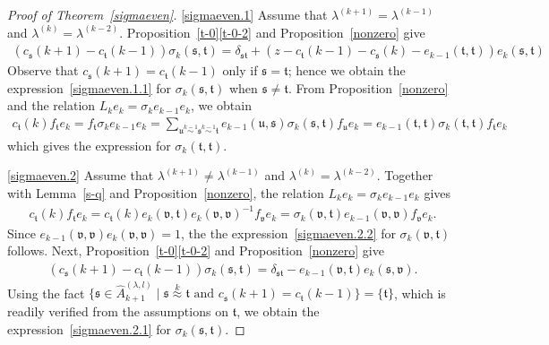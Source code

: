 \documentclass[11pt,a4paper,reqno,svgnames]{amsart}
\theoremstyle{plain}
\theoremstyle{definition}
\numberwithin{equation}{section}
\begin{document}
\begin{proof}[Proof of Theorem~\ref{sigmaeven}] 
\eqref{sigmaeven.1} Assume that  $\lambda^{(k+1)}=\lambda^{(k-1)}$ and $\lambda^{(k)}=\lambda^{(k-2)}$. Proposition~\ref{t-0}\eqref{t-0-2} and Proposition~\ref{nonzero} give
\begin{align*}
(c_\mathfrak{s}(k+1)-c_\mathfrak{t}(k-1))\sigma_{k}(\mathfrak{s,t})=\delta_\mathfrak{st}+(z-c_\mathfrak{t}(k-1)-c_\mathfrak{s}(k)-e_{k-1}(\mathfrak{t,t})) e_k(\mathfrak{s,t})
\end{align*}
Observe that $c_\mathfrak{s}(k+1)=c_\mathfrak{t}(k-1)$ only if $\mathfrak{s}=\mathfrak{t}$; hence we obtain the expression~\eqref{sigmaeven.1.1} for $\sigma_k(\mathfrak{s,t})$ when $\mathfrak{s}\ne\mathfrak{t}$. From Proposition~\ref{nonzero} and the relation $L_ke_k=\sigma_ke_{k-1}e_k$, we obtain
\begin{align*}
c_\mathfrak{t}(k)f_\mathfrak{t}e_k=f_\mathfrak{t}\sigma_ke_{k-1}e_k= \sum_{\mathfrak{u}\stackrel{k-1}{\sim}\mathfrak{s}\stackrel{k-1}{\sim}\mathfrak{t}}e_{k-1}(\mathfrak{u,s})\sigma_k(\mathfrak{s,t})f_\mathfrak{u}e_k=e_{k-1}(\mathfrak{t,t})\sigma_k(\mathfrak{t,t})f_\mathfrak{t}e_k
\end{align*}
which gives the expression for $\sigma_k(\mathfrak{t,t})$. 

\eqref{sigmaeven.2} Assume that  $\lambda^{(k+1)}\ne \lambda^{(k-1)}$ and $\lambda^{(k)}=\lambda^{(k-2)}$. Together with Lemma~\ref{s-q} and Proposition~\ref{nonzero}, the relation $L_ke_k=\sigma_ke_{k-1}e_k$ gives
\begin{align*}
c_\mathfrak{t}(k)f_\mathfrak{t}e_{k}=c_\mathfrak{t}(k)e_k(\mathfrak{v,t})e_{k}(\mathfrak{v,v})^{-1}f_\mathfrak{v}e_k=\sigma_{k}(\mathfrak{v,t})e_{k-1}(\mathfrak{v,v})f_\mathfrak{v}e_k.
\end{align*}
Since $e_{k-1}(\mathfrak{v,v}) e_k(\mathfrak{v,v})=1$, the the expression~\eqref{sigmaeven.2.2} for $\sigma_k(\mathfrak{v,t})$  follows. Next, Proposition~\ref{t-0}\eqref{t-0-2} and Proposition~\ref{nonzero} give
\begin{align*}
(c_\mathfrak{s}(k+1)-c_\mathfrak{t}(k-1))\sigma_k(\mathfrak{s,t})=\delta_\mathfrak{st}-e_{k-1}(\mathfrak{v,t}) e_k(\mathfrak{s,v}).
\end{align*}
Using the fact $\lbrace \mathfrak{s}\in \hat{A}_{k+1}^{(\lambda,l)}\mid\mathfrak{s}\stackrel{k}{\approx}\mathfrak{t}\text{ and }c_\mathfrak{s}(k+1)=c_\mathfrak{t}(k-1)\rbrace=\lbrace\mathfrak{t}\rbrace$, which is readily verified from the assumptions on $\mathfrak{t}$, we obtain the expression~\eqref{sigmaeven.2.1} for $\sigma_k(\mathfrak{s,t})$. 


\end{proof}
\end{document}
